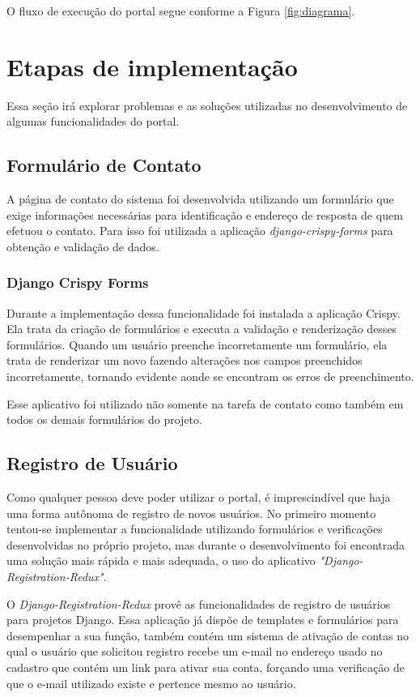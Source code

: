\documentclass[tg]{mdtufsm}
\begin{document}
O fluxo de execução do portal segue conforme a Figura \ref{fig:diagrama}.

\section{Etapas de implementação}
Essa seção irá explorar problemas e as soluções utilizadas no desenvolvimento de algumas funcionalidades do portal.
\subsection{Formulário de Contato}
A página de contato do sistema foi desenvolvida utilizando um formulário que exige informações necessárias para identificação e endereço de resposta de quem efetuou o contato. Para isso foi utilizada a aplicação \emph{django-crispy-forms} para obtenção e validação de dados.

\subsubsection{Django Crispy Forms}
Durante a implementação dessa funcionalidade foi instalada a aplicação Crispy. Ela trata da criação de formulários e executa a validação e renderização desses formulários. Quando um usuário preenche incorretamente um formulário, ela trata de renderizar um novo fazendo alterações nos campos preenchidos incorretamente, tornando evidente aonde se encontram os erros de preenchimento.

Esse aplicativo foi utilizado não somente na tarefa de contato como também em todos os demais formulários do projeto.

\subsection{Registro de Usuário}


Como qualquer pessoa deve poder utilizar o portal, é imprescindível que haja uma forma autônoma de registro de novos usuários. No primeiro momento tentou-se implementar a funcionalidade utilizando formulários e verificações desenvolvidas no próprio projeto, mas durante o desenvolvimento foi encontrada uma solução mais rápida e mais adequada, o uso do aplicativo \emph{ "Django-Registration-Redux"}.

O \emph{Django-Registration-Redux} provê as funcionalidades de registro de usuários para projetos Django. Essa aplicação já dispõe de templates e formulários para desempenhar a sua função, também contém um sistema de ativação de contas no qual o usuário que solicitou registro recebe um e-mail no endereço usado no cadastro que contém um link para ativar sua conta, forçando uma verificação de que o e-mail utilizado existe e pertence mesmo ao usuário.
\end{document}
